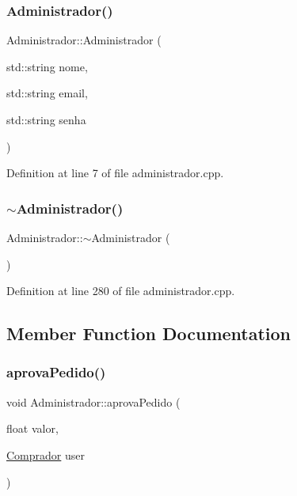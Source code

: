 \subsubsection{\texorpdfstring{Administrador()}{Administrador()}}
{\footnotesize\ttfamily Administrador\+::\+Administrador (\begin{DoxyParamCaption}\item[{std\+::string}]{nome,  }\item[{std\+::string}]{email,  }\item[{std\+::string}]{senha }\end{DoxyParamCaption})}



Definition at line 7 of file administrador.\+cpp.

\mbox{\label{class_administrador_a0e044ad3a41da3a0ff2c1ec7ef8fa800}} 
\subsubsection{\texorpdfstring{$\sim$\+Administrador()}{~Administrador()}}
{\footnotesize\ttfamily Administrador\+::$\sim$\+Administrador (\begin{DoxyParamCaption}{ }\end{DoxyParamCaption})}



Definition at line 280 of file administrador.\+cpp.



\subsection{Member Function Documentation}
\mbox{\label{class_administrador_a05604fe263be531162e5e98f57d5d5c2}} 
\subsubsection{\texorpdfstring{aprova\+Pedido()}{aprovaPedido()}}
{\footnotesize\ttfamily void Administrador\+::aprova\+Pedido (\begin{DoxyParamCaption}\item[{float}]{valor,  }\item[{\hyperlink{class_comprador}{Comprador}}]{user }\end{DoxyParamCaption})}

